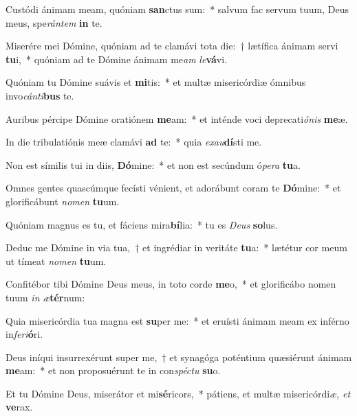 \item Custódi ánimam meam, quóniam \textbf{san}ctus sum:~* salvum fac servum tuum, Deus meus, spe\hspace{0.03em}\textit{rántem} \textbf{in} te.
\item Miserére mei Dómine, quóniam ad te clamávi tota die:~† lætífica ánimam servi \textbf{tu}i,~* quóniam ad te Dómine ánimam me\hspace{0.03em}\textit{am} \textit{le}\hspace{0.01em}\textbf{vá}vi.
\item Quóniam tu Dómine suávis et \textbf{mi}tis:~* et multæ misericórdiæ ómnibus invo\hspace{0.03em}\textit{cánti}\hspace{0.01em}\textbf{bus} te.
\item Auribus pércipe Dómine oratiónem \textbf{me}am:~* et inténde voci deprecati\tinyhspace\textit{ónis} \textbf{me}æ.
\item In die tribulatiónis meæ clamávi \textbf{ad} te:~* quia \textit{exau}\textbf{dí}sti me.
\item Non est símilis tui in diis, \textbf{Dó}mine:~* et non est secúndum ó\textit{pera} \textbf{tu}a.
\item Omnes gentes quascúmque fecísti vénient, et adorábunt coram te \textbf{Dó}mine:~* et glorificábunt \textit{nomen} \textbf{tu}um.
\item Quóniam magnus es tu, et fáciens mira\textbf{bí}lia:~* tu es \textit{Deus} \textbf{so}lus.
\item Deduc me Dómine in via tua,~† et ingrédiar in veritáte \textbf{tu}a:~* lætétur cor meum ut tímeat \textit{nomen} \textbf{tu}um.
\item Confitébor tibi Dómine Deus meus, in toto corde \textbf{me}o,~* et glorificábo nomen tuum \textit{in} \textit{æ}\textbf{tér}num:
\item Quia misericórdia tua magna est \textbf{su}per me:~* et eruísti ánimam meam ex inférno in\textit{feri}\textbf{ó}ri.
\item Deus iníqui insurrexérunt super me,~† et synagóga poténtium quæsiérunt ánimam \textbf{me}am:~* et non proposuérunt te in con\hspace{0.03em}\textit{spéctu} \textbf{su}o.
\item Et tu Dómine Deus, miserátor et mi\textbf{sé}ricors,~* pátiens, et multæ misericórdi\hspace{0.03em}\textit{æ,} \textit{et} \textbf{ve}rax.
